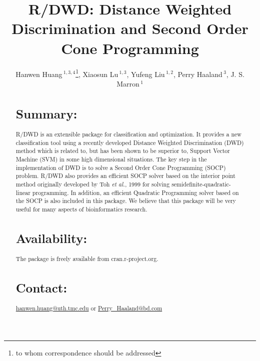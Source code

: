 \documentclass{bioinfo}
\begin{document}

\title[short Title]{R/DWD: Distance Weighted Discrimination and Second
  Order Cone Programming} \author[Sample \textit{et~al}]{Hanwen
  Huang\,$^{1,3,4}$\footnote{to whom correspondence should be
    addressed}, Xiaosun Lu\,$^{1,3}$, Yufeng Liu\,$^{1,2}$, Perry
  Haaland\,$^{3}$, J. S. Marron\,$^1$ \address{$^{1}$Department of
    Statistics and Operations Research, $^{2}$Carolina Center for
    Genome Sciences, University of North Carolina at Chapel Hill,
    Chapel Hill, NC 27599 USA.\\ $^{3}$BD Technologies, 21 Davis
    Drive, RTP, NC 27709 USA.\\$^{4}$University of Texas Health
    Science Center at Houston, Houston, TX 77030 USA.}}



\maketitle

\begin{abstract}

\section{Summary:}
R/DWD is an extensible package for classification and optimization. It
provides a new classification tool using a recently developed Distance
Weighted Discrimination (DWD) method which is related to, but has been
shown to be superior to, Support Vector Machine (SVM) in some high
dimensional situations.  The key step in the implementation of DWD is
to solve a Second Order Cone Programming (SOCP) problem. R/DWD also
provides an efficient SOCP solver based on the interior point method
originally developed by Toh {\em et al.}, 1999 for solving
semidefinite-quadratic-linear programming. In addition, an efficient
Quadratic Programming solver based on the SOCP is also included in
this package. We believe that this package will be very useful for
many aspects of bioinformatics research.

\section{Availability:} The package is freely available from cran.r-project.org.

\section{Contact:} \href{hanwen.huang@uth.tmc.edu}{hanwen.huang@uth.tmc.edu} or
\href{Perry\_Haaland@bd.com}{Perry\_Haaland@bd.com}
\end{abstract}
\end{document}
